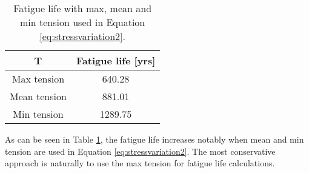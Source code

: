 \begin{table} [H]
\centering
\begin{tabular}{ |c|c|}
\hline
T & Fatigue life [yrs] \\ 
 \hline
 \hline
	Max tension & 640.28 \\ 
	Mean tension & 881.01 \\ 
	Min tension & 1289.75 \\ 
	\hline
\end{tabular}
\caption{Fatigue life with max, mean and min tension used in Equation \ref{eq:stressvariation2}.}
\label{table:maxmin}
\end{table} 
As can be seen in Table \ref{table:maxmin}, the fatigue life increases notably when mean and min tension are used in Equation \ref{eq:stressvariation2}. The most conservative approach is naturally to use the max tension for fatigue life calculations. 
